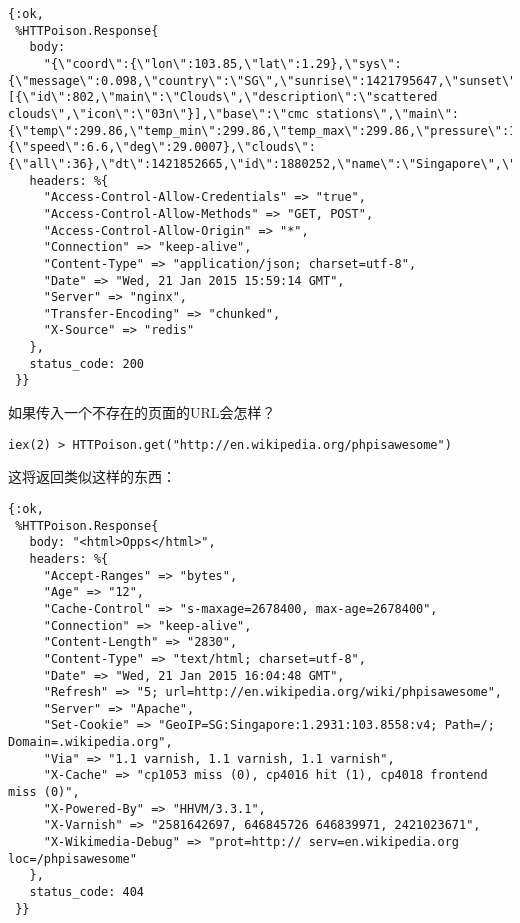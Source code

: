 \begin{code}{}
\begin{verbatim}
{:ok,
 %HTTPoison.Response{
   body:
     "{\"coord\":{\"lon\":103.85,\"lat\":1.29},\"sys\":{\"message\":0.098,\"country\":\"SG\",\"sunrise\":1421795647,\"sunset\":1421839059},\"weather\":[{\"id\":802,\"main\":\"Clouds\",\"description\":\"scattered clouds\",\"icon\":\"03n\"}],\"base\":\"cmc stations\",\"main\":{\"temp\":299.86,\"temp_min\":299.86,\"temp_max\":299.86,\"pressure\":1028.96,\"sea_level\":1029.64,\"grnd_level\":1028.96,\"humidity\":100},\"wind\":{\"speed\":6.6,\"deg\":29.0007},\"clouds\":{\"all\":36},\"dt\":1421852665,\"id\":1880252,\"name\":\"Singapore\",\"cod\":200}\n",
   headers: %{
     "Access-Control-Allow-Credentials" => "true",
     "Access-Control-Allow-Methods" => "GET, POST",
     "Access-Control-Allow-Origin" => "*",
     "Connection" => "keep-alive",
     "Content-Type" => "application/json; charset=utf-8",
     "Date" => "Wed, 21 Jan 2015 15:59:14 GMT",
     "Server" => "nginx",
     "Transfer-Encoding" => "chunked",
     "X-Source" => "redis"
   },
   status_code: 200
 }}
\end{verbatim}
\end{code}

如果传入一个不存在的页面的URL会怎样？

\begin{code}{}
\begin{verbatim}
iex(2) > HTTPoison.get("http://en.wikipedia.org/phpisawesome")
\end{verbatim}
\end{code}

这将返回类似这样的东西：

\begin{code}{}
\begin{verbatim}
{:ok,
 %HTTPoison.Response{
   body: "<html>Opps</html>",
   headers: %{
     "Accept-Ranges" => "bytes",
     "Age" => "12",
     "Cache-Control" => "s-maxage=2678400, max-age=2678400",
     "Connection" => "keep-alive",
     "Content-Length" => "2830",
     "Content-Type" => "text/html; charset=utf-8",
     "Date" => "Wed, 21 Jan 2015 16:04:48 GMT",
     "Refresh" => "5; url=http://en.wikipedia.org/wiki/phpisawesome",
     "Server" => "Apache",
     "Set-Cookie" => "GeoIP=SG:Singapore:1.2931:103.8558:v4; Path=/; Domain=.wikipedia.org",
     "Via" => "1.1 varnish, 1.1 varnish, 1.1 varnish",
     "X-Cache" => "cp1053 miss (0), cp4016 hit (1), cp4018 frontend miss (0)",
     "X-Powered-By" => "HHVM/3.3.1",
     "X-Varnish" => "2581642697, 646845726 646839971, 2421023671",
     "X-Wikimedia-Debug" => "prot=http:// serv=en.wikipedia.org loc=/phpisawesome"
   },
   status_code: 404
 }}
\end{verbatim}
\end{code}

